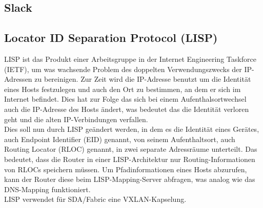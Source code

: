 \subsection{Slack}

\subsection{Locator ID Separation Protocol (LISP)}
LISP ist das Produkt einer Arbeitsgruppe in der Internet Engineering Taskforce (IETF), um was wachsende Problem des doppelten Verwendungszwecks der IP-Adressen zu bereinigen. Zur Zeit wird die IP-Adresse benutzt um die Identität eines Hosts festzulegen und auch den Ort zu bestimmen, an dem er sich im Internet befindet. Dies hat zur Folge das sich bei einem Aufenthalsortwechsel auch die IP-Adresse des Hosts ändert, was bedeutet das die Identität verloren geht und die alten IP-Verbindungen verfallen. \\

Dies soll nun durch LISP geändert werden, in dem es die Identität eines Gerätes, auch Endpoint Identifier (EID) genannt, von seinem Aufenthaltsort, auch Routing Locator (RLOC) genannt, in zwei separate Adressräume unterteilt. Das bedeutet, dass die Router in einer LISP-Architektur nur Routing-Informationen von RLOCs speichern müssen. Um Pfadinformationen eines Hosts abzurufen, kann der Router diese beim LISP-Mapping-Server abfragen, was analog wie das DNS-Mapping funktioniert. \\

LISP verwendet für SDA/Fabric eine VXLAN-Kapselung.

